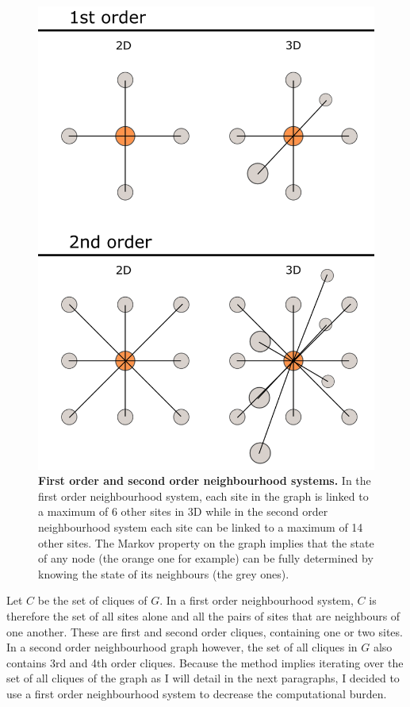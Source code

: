 	\begin{figure}[H]
\centerline{\includegraphics[width=0.8\linewidth]{gfx/chapter4/graph.png}}
\caption{{\bf First order and second order neighbourhood systems.} In the first order neighbourhood system, each site in the graph is linked to a maximum of 6 other sites in 3D while in the second order neighbourhood system each site can be linked to a maximum of 14 other sites. The Markov property on the graph implies that the state of any node (the orange one for example) can be fully determined by knowing the state of its neighbours (the grey ones).}\label{fig:graph}
	\end{figure}

	Let $C$ be the set of cliques of $G$. In a first order neighbourhood system, $C$ is therefore the set of all sites alone and all the pairs of sites that are neighbours of one another. These are first and second order cliques, containing one or two sites. In a second order neighbourhood graph however, the set of all cliques in $G$ also contains 3rd and 4th order cliques. Because the method implies iterating over the set of all cliques of the graph as I will detail in the next paragraphs, I decided to use a first order neighbourhood system to decrease the computational burden.


